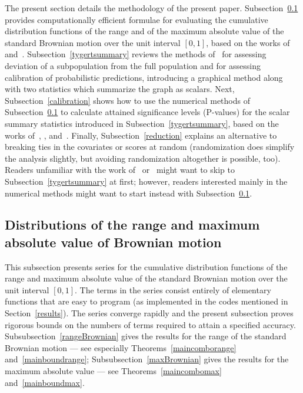 \documentclass[12pt]{article}
\begin{document}
The present section details the methodology of the present paper.
Subsection~\ref{distributions} provides computationally efficient formulae
for evaluating the cumulative distribution functions
of the range and of the maximum absolute value of the standard Brownian motion
over the unit interval $[0, 1]$, based on the works of~\citet{feller}
and~\citet{darling-siegert}.
Subsection~\ref{tygertsummary} reviews the methods
of~\citet{tygert_full} for assessing deviation of a subpopulation
from the full population and for assessing calibration
of probabilistic predictions, introducing a graphical method
along with two statistics which summarize the graph as scalars.
Next, Subsection~\ref{calibration} shows how to use
the numerical methods of Subsection~\ref{distributions}
to calculate attained significance levels (P-values)
for the scalar summary statistics introduced in Subsection~\ref{tygertsummary},
based on the works of~\citet{delgado}, \citet{diebolt}, and~\citet{stute}.
Finally, Subsection~\ref{reduction} explains an alternative to breaking ties
in the covariates or scores at random
(randomization does simplify the analysis slightly,
but avoiding randomization altogether is possible, too).
Readers unfamiliar with the work of~\citet{tygert_full} or~\citet{tygert_two}
might want to skip to Subsection~\ref{tygertsummary} at first; however,
readers interested mainly in the numerical methods might want to start instead
with Subsection~\ref{distributions}.



\subsection{Distributions of the range and maximum absolute value
of Brownian motion}
\label{distributions}

This subsection presents series for the cumulative distribution functions
of the range and maximum absolute value of the standard Brownian motion
over the unit interval $[0, 1]$.
The terms in the series consist entirely of elementary functions that are easy
to program (as implemented in the codes mentioned in Section~\ref{results}).
The series converge rapidly and the present subsection proves rigorous bounds
on the numbers of terms required to attain a specified accuracy.
Subsubsection~\ref{rangeBrownian} gives the results
for the range of the standard Brownian motion ---
see especially Theorems~\ref{maincomborange} and~\ref{mainboundrange};
Subsubsection~\ref{maxBrownian} gives the results
for the maximum absolute value ---
see Theorems~\ref{maincombomax} and~\ref{mainboundmax}.
\end{document}
